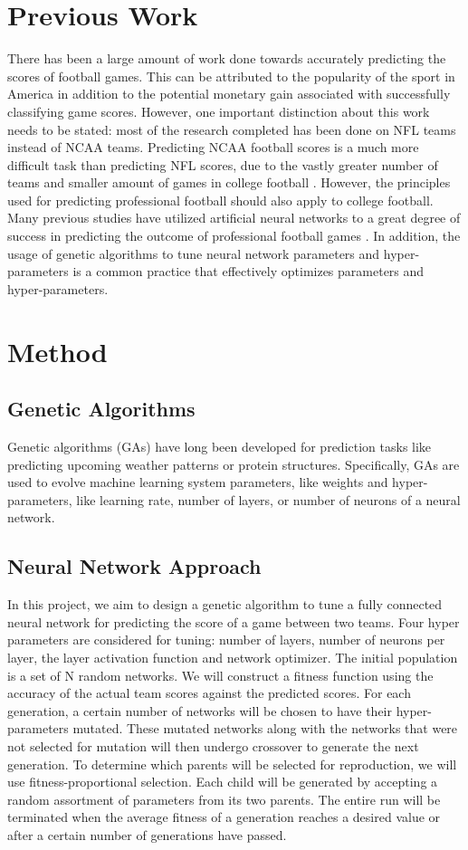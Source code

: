 \documentclass[10pt,twocolumn,letterpaper]{article}
\begin{document}
\section{Previous Work}
There has been a large amount of work done towards accurately predicting the scores of football games. This can be attributed to the popularity of the sport in America in addition to the potential monetary gain associated with successfully classifying game scores. However, one important distinction about this work needs to be stated: most of the research completed has been done on NFL teams instead of NCAA teams. Predicting NCAA football scores is a much more difficult task than predicting NFL scores, due to the vastly greater number of teams and smaller amount of games in college football \cite{blaikie2011nfl}. However, the principles used for predicting professional football should also apply to college football. Many previous studies have utilized artificial neural networks to a great degree of success in predicting the outcome of professional football games \cite{blaikie2011nfl,david2011nfl,purucker1996neural}. In addition, the usage of genetic algorithms to tune neural network parameters and hyper-parameters is a common practice that effectively optimizes parameters and hyper-parameters\cite{bashiri2011tuning}.

\section{Method}
\subsection{Genetic Algorithms}
Genetic algorithms (GAs) have long been developed for prediction tasks like predicting upcoming weather patterns or protein structures.\cite{mitchell1995genetic} Specifically, GAs are used to evolve machine learning system parameters, like weights and hyper-parameters, like learning rate, number of layers, or number of neurons of a neural network.
\subsection{Neural Network Approach}
In this project, we aim to design a genetic algorithm to tune a fully connected neural network for predicting the score of a game between two teams. Four hyper parameters are considered for tuning: number of layers, number of neurons per layer, the layer activation function and network optimizer. The initial population is a set of N random networks. We will construct a fitness function using the accuracy of the actual team scores against the predicted scores. For each generation, a certain number of networks will be chosen to have their hyper-parameters mutated. These mutated networks along with the networks that were not selected for mutation will then undergo crossover to generate the next generation. To determine which parents will be selected for reproduction, we will use fitness-proportional selection. Each child will be generated by accepting a random assortment of parameters from its two parents. The entire run will be terminated when the average fitness of a generation reaches a desired value or after a certain number of generations have passed.
\end{document}
